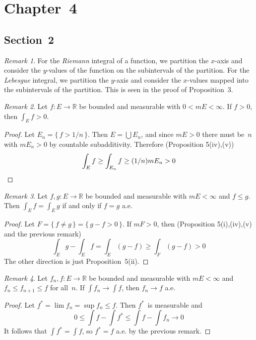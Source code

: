 \documentclass[letterpaper,12pt]{article}
\newcommand{\R}{\mathbb{R}}
\newcommand{\bigunion}{\bigcup}
\newcommand{\m}{m}
\theoremstyle{plain}
\theoremstyle{definition}
\theoremstyle{remark}
\newtheorem*{rmk}{Remark}
\begin{document}
\section*{Chapter~4}
\subsection*{Section~2}
\begin{rmk}
For the \emph{Riemann} integral of a function, we partition the \(x\)-axis and consider the \(y\)-values of the function on the subintervals of the partition. For the \emph{Lebesgue} integral, we partition the \(y\)-axis and consider the \(x\)-values mapped into the subintervals of the partition. This is seen in the proof of Proposition~3.
\end{rmk}

\begin{rmk}
Let \(f:E\to\R\) be bounded and measurable with \(0<\m E<\infty\). If \(f>0\), then \(\int_E f>0\).
\end{rmk}
\begin{proof}
Let \(E_n=\{\,f>1/n\,\}\). Then \(E=\bigunion E_n\), and since \(\m E>0\) there must be~\(n\) with \(\m E_n>0\) by countable subadditivity. Therefore (Proposition 5(iv),(v))
\[\int_E f\ge\int_{E_n}f\ge(1/n)\m E_n>0\qedhere\]
\end{proof}

\begin{rmk}
Let \(f,g:E\to\R\) be bounded and measurable with \(\m E<\infty\) and \(f\le g\). Then \(\int_E f=\int_E g\) if and only if \(f=g\) a.e.
\end{rmk}
\begin{proof}
Let \(F=\{\,f\ne g\,\}=\{\,g-f>0\,\}\). If \(\m F>0\), then (Proposition 5(i),(iv),(v) and the previous remark)
\[\int_E g-\int_E f=\int_E(g-f)\ge\int_F(g-f)>0\]
The other direction is just Proposition~5(ii).
\end{proof}

\begin{rmk}
Let \(f_n,f:E\to\R\) be bounded and measurable with \(\m E<\infty\) and \(f_n\le f_{n+1}\le f\) for all~\(n\). If \(\int f_n\to\int f\), then \(f_n\to f\) a.e.
\end{rmk}
\begin{proof}
Let \(f^*=\lim f_n=\sup f_n\le f\). Then \(f^*\)~is measurable and
\[0\le\int f-\int f^*\le\int f-\int f_n\to 0\]
It follows that \(\int f^*=\int f\), so \(f^*=f\) a.e. by the previous remark.
\end{proof}
\end{document}
